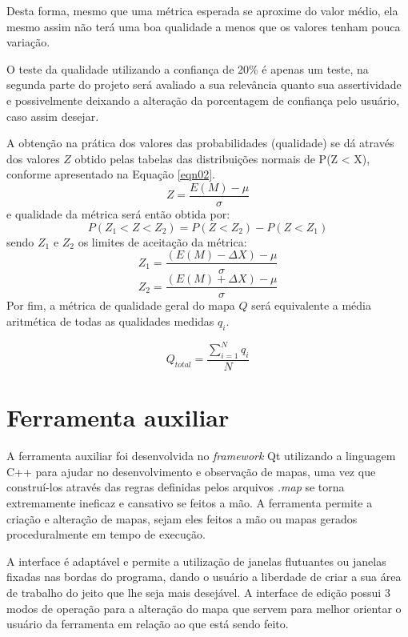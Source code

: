 Desta forma, mesmo que uma métrica esperada se aproxime do valor médio, ela mesmo assim não terá uma boa qualidade a menos que os valores tenham pouca variação.

O teste da qualidade utilizando a confiança de 20\% é apenas um teste, na segunda parte do projeto será avaliado a sua relevância quanto sua assertividade e possivelmente deixando a alteração da porcentagem de confiança pelo usuário, caso assim desejar. 

A obtenção na prática dos valores das probabilidades (qualidade) se dá através dos valores $Z$ obtido pelas tabelas das distribuições normais de P(Z < X), conforme apresentado na Equação \ref{eqn02}.
\begin{equation}
\label{eqn02}
	Z = \frac{E(M) - \mu}{\sigma}
\end{equation}
e qualidade  da métrica será então obtida por:
\begin{equation}
\label{eqn03}
	P(Z_1 < Z < Z_2) = P(Z < Z_2) - P(Z < Z_1)
\end{equation}
sendo $Z_1$ e $Z_2$ os limites de aceitação da métrica:
\begin{equation}
\label{eqn04}
	Z_1 = \frac{(E(M) - \Delta X) - \mu}{\sigma}
\end{equation}
\begin{equation}
\label{eqn05}
	Z_2 = \frac{(E(M) + \Delta X) - \mu}{\sigma}
\end{equation}
Por fim, a métrica de qualidade geral do mapa $Q$ será equivalente a média aritmética de todas as qualidades medidas $q_i$. 

\begin{equation}
\label{eqn04}
	Q_{total} = \frac{\sum_{i=1}^{N} q_i}{N}
\end{equation}

\section{Ferramenta auxiliar}

A ferramenta auxiliar foi desenvolvida no \textit{framework} Qt utilizando a linguagem C++ para ajudar no desenvolvimento e observação de mapas, uma vez que construí-los através das regras definidas pelos arquivos \textit{.map} se torna extremamente ineficaz e cansativo se feitos a mão. A ferramenta permite a criação e alteração de mapas, sejam eles feitos a mão ou mapas gerados proceduralmente em tempo de execução.

A interface é adaptável e permite a utilização de janelas flutuantes ou janelas fixadas nas bordas do programa, dando o usuário a liberdade de criar a sua área de trabalho do jeito que lhe seja mais desejável. A interface de edição possui 3 modos de operação para a alteração do mapa que servem para melhor orientar o usuário da ferramenta em relação ao que está sendo feito. 

